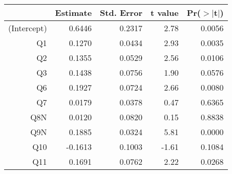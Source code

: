 \begin{table}[ht]
\centering
\begin{tabular}{rrrrr}
  \hline
 & Estimate & Std. Error & t value & Pr($>$$|$t$|$) \\ 
  \hline
(Intercept) & 0.6446 & 0.2317 & 2.78 & 0.0056 \\ 
  Q1 & 0.1270 & 0.0434 & 2.93 & 0.0035 \\ 
  Q2 & 0.1355 & 0.0529 & 2.56 & 0.0106 \\ 
  Q3 & 0.1438 & 0.0756 & 1.90 & 0.0576 \\ 
  Q6 & 0.1927 & 0.0724 & 2.66 & 0.0080 \\ 
  Q7 & 0.0179 & 0.0378 & 0.47 & 0.6365 \\ 
  Q8N & 0.0120 & 0.0820 & 0.15 & 0.8838 \\ 
  Q9N & 0.1885 & 0.0324 & 5.81 & 0.0000 \\ 
  Q10 & -0.1613 & 0.1003 & -1.61 & 0.1084 \\ 
  Q11 & 0.1691 & 0.0762 & 2.22 & 0.0268 \\ 
   \hline
\end{tabular}
\end{table}
